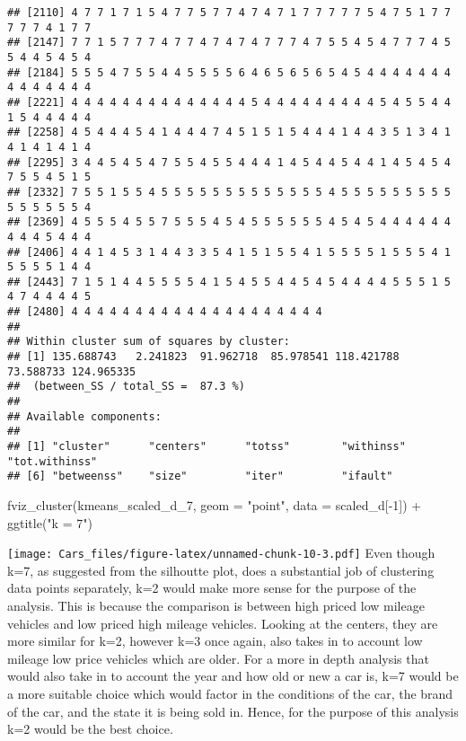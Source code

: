 \documentclass[
]{article}
\newenvironment{Shaded}{\begin{snugshade}}{\end{snugshade}}
\newcommand{\AttributeTok}[1]{\textcolor[rgb]{0.77,0.63,0.00}{#1}}
\newcommand{\DecValTok}[1]{\textcolor[rgb]{0.00,0.00,0.81}{#1}}
\newcommand{\FunctionTok}[1]{\textcolor[rgb]{0.00,0.00,0.00}{#1}}
\newcommand{\NormalTok}[1]{#1}
\newcommand{\SpecialCharTok}[1]{\textcolor[rgb]{0.00,0.00,0.00}{#1}}
\newcommand{\StringTok}[1]{\textcolor[rgb]{0.31,0.60,0.02}{#1}}
\begin{document}
\begin{verbatim}
## [2110] 4 7 7 1 7 1 5 4 7 7 5 7 7 4 7 4 7 1 7 7 7 7 7 5 4 7 5 1 7 7 7 7 7 4 1 7 7
## [2147] 7 7 1 5 7 7 7 4 7 7 4 7 4 7 4 7 7 7 4 7 5 5 4 5 4 7 7 7 4 5 5 4 4 5 4 5 4
## [2184] 5 5 5 4 7 5 5 4 4 5 5 5 5 6 4 6 5 6 5 6 5 4 5 4 4 4 4 4 4 4 4 4 4 4 4 4 4
## [2221] 4 4 4 4 4 4 4 4 4 4 4 4 4 4 5 4 4 4 4 4 4 4 4 4 5 4 5 5 4 4 1 5 4 4 4 4 4
## [2258] 4 5 4 4 4 5 4 1 4 4 4 7 4 5 1 5 1 5 4 4 4 1 4 4 3 5 1 3 4 1 4 1 4 1 4 1 4
## [2295] 3 4 4 5 4 5 4 7 5 5 4 5 5 4 4 4 1 4 5 4 4 5 4 4 1 4 5 4 5 4 7 5 5 4 5 1 5
## [2332] 7 5 5 1 5 5 4 5 5 5 5 5 5 5 5 5 5 5 5 5 4 5 5 5 5 5 5 5 5 5 5 5 5 5 5 5 4
## [2369] 4 5 5 5 4 5 5 7 5 5 5 4 5 4 5 5 5 5 5 5 4 5 4 5 4 4 4 4 4 4 4 4 4 5 4 4 4
## [2406] 4 4 1 4 5 3 1 4 4 3 3 5 4 1 5 1 5 5 4 1 5 5 5 5 1 5 5 5 4 1 5 5 5 5 1 4 4
## [2443] 7 1 5 1 4 4 5 5 5 5 4 1 5 4 5 5 4 4 5 4 5 4 4 4 4 5 5 5 1 5 4 7 4 4 4 4 5
## [2480] 4 4 4 4 4 4 4 4 4 4 4 4 4 4 4 4 4 4 4 4
## 
## Within cluster sum of squares by cluster:
## [1] 135.688743   2.241823  91.962718  85.978541 118.421788  73.588733 124.965335
##  (between_SS / total_SS =  87.3 %)
## 
## Available components:
## 
## [1] "cluster"      "centers"      "totss"        "withinss"     "tot.withinss"
## [6] "betweenss"    "size"         "iter"         "ifault"
\end{verbatim}

\begin{Shaded}
\begin{Highlighting}[]
\FunctionTok{fviz\_cluster}\NormalTok{(kmeans\_scaled\_d\_7, }\AttributeTok{geom =} \StringTok{"point"}\NormalTok{, }\AttributeTok{data =}\NormalTok{ scaled\_d[}\SpecialCharTok{{-}}\DecValTok{1}\NormalTok{]) }\SpecialCharTok{+} \FunctionTok{ggtitle}\NormalTok{(}\StringTok{"k = 7"}\NormalTok{)}
\end{Highlighting}
\end{Shaded}

\texttt{[image: Cars\_files/figure-latex/unnamed-chunk-10-3.pdf]} Even
though k=7, as suggested from the silhoutte plot, does a substantial job
of clustering data points separately, k=2 would make more sense for the
purpose of the analysis. This is because the comparison is between high
priced low mileage vehicles and low priced high mileage vehicles.
Looking at the centers, they are more similar for k=2, however k=3 once
again, also takes in to account low mileage low price vehicles which are
older. For a more in depth analysis that would also take in to account
the year and how old or new a car is, k=7 would be a more suitable
choice which would factor in the conditions of the car, the brand of the
car, and the state it is being sold in. Hence, for the purpose of this
analysis k=2 would be the best choice.
\end{document}
